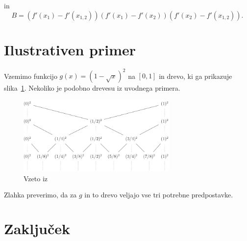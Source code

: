 \documentclass[a4paper, 12pt, titlepage]{article}
\begin{document}
in
$$
B = (f'(x_1) - f'(x_{1,2}))(f'(x_1) - f'(x_2))(f'(x_2) - f'(x_{1,2}))\text{.}
$$




\section{Ilustrativen primer}

Vzemimo funkcijo $ g(x) = (1 - \sqrt{x})^2 $ na $ [0, 1] $ in drevo, ki ga prikazuje slika~\ref{ilustrativen_primer_drevo}. Nekoliko je podobno drevesu iz uvodnega primera.

\begin{figure}[h]
    \centering
    \includegraphics[width=0.7\textwidth]{slike/ilustrativen_primer_drevo.png}
    \caption{Vzeto iz~\cite{osnovni_clanek}}
    \label{ilustrativen_primer_drevo}
\end{figure}

Zlahka preverimo, da za $ g $ in to drevo veljajo vse tri potrebne predpostavke.

\newpage




\section{Zaključek}
\newpage
\nocite{*}      %
\printbibliography
\end{document}

